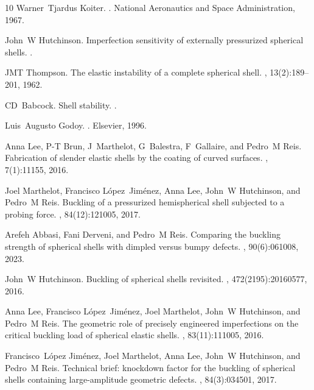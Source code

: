 \documentclass[twocolumn,letter,11pt]{article}
\begin{document}
\begin{thebibliography}{10}
Warner~Tjardus Koiter.
.
\newblock National Aeronautics and Space Administration, 1967.

John~W Hutchinson.
\newblock Imperfection sensitivity of externally pressurized spherical shells.
.

JMT Thompson.
\newblock The elastic instability of a complete spherical shell.
, 13(2):189--201, 1962.

CD~Babcock.
\newblock Shell stability.
.

Luis~Augusto Godoy.
.
\newblock Elsevier, 1996.

Anna Lee, P-T Brun, J~Marthelot, G~Balestra, F~Gallaire, and Pedro~M Reis.
\newblock Fabrication of slender elastic shells by the coating of curved
  surfaces.
, 7(1):11155, 2016.

Joel Marthelot, Francisco L{\'o}pez~Jim{\'e}nez, Anna Lee, John~W Hutchinson,
  and Pedro~M Reis.
\newblock Buckling of a pressurized hemispherical shell subjected to a probing
  force.
, 84(12):121005, 2017.

Arefeh Abbasi, Fani Derveni, and Pedro~M Reis.
\newblock Comparing the buckling strength of spherical shells with dimpled
  versus bumpy defects.
, 90(6):061008, 2023.

John~W Hutchinson.
\newblock Buckling of spherical shells revisited.
, 472(2195):20160577, 2016.

Anna Lee, Francisco L{\'o}pez~Jim{\'e}nez, Joel Marthelot, John~W Hutchinson,
  and Pedro~M Reis.
\newblock The geometric role of precisely engineered imperfections on the
  critical buckling load of spherical elastic shells.
, 83(11):111005, 2016.

Francisco~L{\'o}pez Jim{\'e}nez, Joel Marthelot, Anna Lee, John~W Hutchinson,
  and Pedro~M Reis.
\newblock Technical brief: knockdown factor for the buckling of spherical
  shells containing large-amplitude geometric defects.
, 84(3):034501, 2017.


\end{thebibliography}
\end{document}
